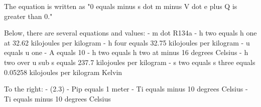 The equation is written as "0 equals minus s dot m minus V dot e plus Q is greater than 0."

Below, there are several equations and values:
- m dot R134a
- h two equals h one at 32.62 kilojoules per kilogram
- h four equals 32.75 kilojoules per kilogram
- u equals u one
- A equals 10
- h two equals h two at minus 16 degrees Celsius
- h two over u sub s equals 237.7 kilojoules per kilogram
- s two equals s three equals 0.05258 kilojoules per kilogram Kelvin

To the right:
- (2.3)
- Pip equals 1 meter
- Ti equals minus 10 degrees Celsius
- Ti equals minus 10 degrees Celsius